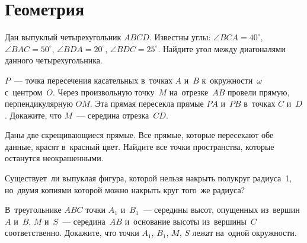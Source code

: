
\section*{Геометрия}


\begin{problems}

\item
Дан выпуклый четырехугольник $ABCD$.
Известны углы:
$\angle BCA = 40^{\circ}$, $\angle BAC = 50^{\circ}$,
$\angle BDA = 20^{\circ}$, $\angle BDC = 25^{\circ}$.
Найдите угол между диагоналями данного четырехугольника.

\item
$P$~--- точка пересечения касательных в~точках $A$ и~$B$ к~окружности~$\omega$
с~центром~$O$.
Через произвольную точку~$M$ на~отрезке~$AB$ провели прямую,
перпендикулярную $OM$.
Эта прямая пересекла прямые $PA$ и~$PB$ в~точках $C$ и~$D$.
Докажите, что $M$~--- середина отрезка~$CD$.

\item
Даны две скрещивающиеся прямые.
Все прямые, которые пересекают обе данные, красят в~красный цвет.
Найдите все точки пространства, которые останутся неокрашенными.

\item
Существует~ли выпуклая фигура, которой нельзя накрыть полукруг радиуса~1,
но~двумя копиями которой можно накрыть круг того~же радиуса?

\item
В~треугольнике $ABC$ точки $A_1$ и~$B_1$~--- середины высот, опущенных
из~вершин $A$ и~$B$, $M$ и~$S$~--- середина~$AB$ и~основание высоты
из~вершины~$C$ соответственно.
Докажите, что точки $A_1$, $B_1$, $M$, $S$ лежат на~одной окружности.

\end{problems}

